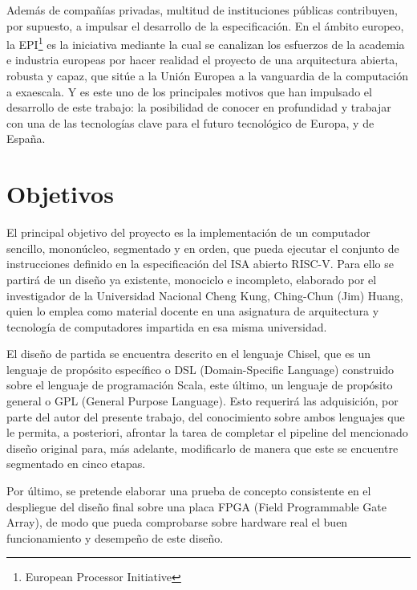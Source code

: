 Además de compañías privadas, multitud de instituciones públicas contribuyen, por supuesto, a impulsar el desarrollo de la especificación. En el ámbito europeo, la EPI\footnote{European Processor Initiative} es la iniciativa mediante la cual se canalizan los esfuerzos de la academia e industria europeas por hacer realidad el proyecto de una arquitectura abierta, robusta y capaz, que sitúe a la Unión Europea a la vanguardia de la computación a exaescala. Y es este uno de los principales motivos que han impulsado el desarrollo de este trabajo: la posibilidad de conocer en profundidad y trabajar con una de las tecnologías clave para el futuro tecnológico de Europa, y de España.


\section{Objetivos}

El principal objetivo del proyecto es la implementación de un computador sencillo, mononúcleo, segmentado y en orden, que pueda ejecutar el conjunto de instrucciones definido en la especificación del ISA abierto RISC-V. Para ello se partirá de un diseño ya existente, monociclo e incompleto, elaborado por el investigador de la Universidad Nacional Cheng Kung, Ching-Chun (Jim) Huang, quien lo emplea como material docente en una asignatura de arquitectura y tecnología de computadores impartida en esa misma universidad.

El diseño de partida se encuentra descrito en el lenguaje Chisel, que es un lenguaje de propósito específico o DSL (Domain-Specific Language) construido sobre el lenguaje de programación Scala, este último, un lenguaje de propósito general o GPL (General Purpose Language). Esto requerirá las adquisición, por parte del autor del presente trabajo, del conocimiento sobre ambos lenguajes que le permita, a posteriori, afrontar la tarea de completar el pipeline del mencionado diseño original para, más adelante, modificarlo de manera que este se encuentre segmentado en cinco etapas.

Por último, se pretende elaborar una prueba de concepto consistente en el despliegue del diseño final sobre una placa FPGA (Field Programmable Gate Array), de modo que pueda comprobarse sobre hardware real el buen funcionamiento y desempeño de este diseño.


